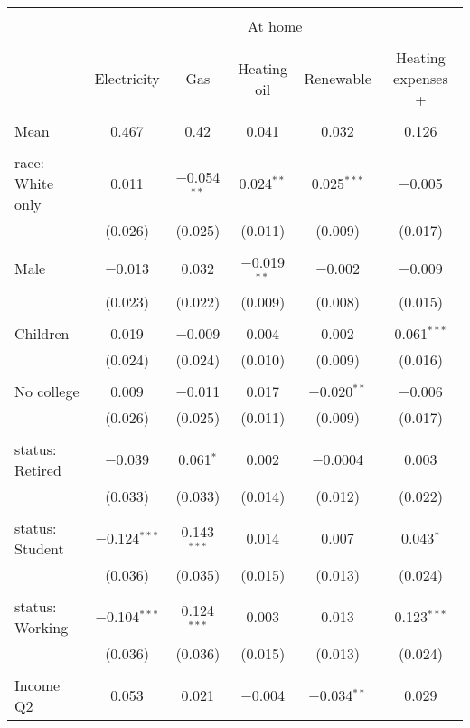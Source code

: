 
\begin{tabular}{@{\extracolsep{5pt}}lccccc} 
\\[-1.8ex]\hline 
\hline \\[-1.8ex] 
 & \multicolumn{5}{c}{At home} \\ 
\cline{2-6} 
\\[-1.8ex] & Electricity & Gas & Heating oil & Renewable & Heating expenses \textdollar 200+ \\ 
\hline \\[-1.8ex] 
 Mean & 0.467 & 0.42 & 0.041 & 0.032 & 0.126  \\ \hline \\[-1.8ex] race: White only & 0.011 & $-$0.054$^{**}$ & 0.024$^{**}$ & 0.025$^{***}$ & $-$0.005 \\ 
  & (0.026) & (0.025) & (0.011) & (0.009) & (0.017) \\ 
  & & & & & \\ 
 Male & $-$0.013 & 0.032 & $-$0.019$^{**}$ & $-$0.002 & $-$0.009 \\ 
  & (0.023) & (0.022) & (0.009) & (0.008) & (0.015) \\ 
  & & & & & \\ 
 Children & 0.019 & $-$0.009 & 0.004 & 0.002 & 0.061$^{***}$ \\ 
  & (0.024) & (0.024) & (0.010) & (0.009) & (0.016) \\ 
  & & & & & \\ 
 No college & 0.009 & $-$0.011 & 0.017 & $-$0.020$^{**}$ & $-$0.006 \\ 
  & (0.026) & (0.025) & (0.011) & (0.009) & (0.017) \\ 
  & & & & & \\ 
 status: Retired & $-$0.039 & 0.061$^{*}$ & 0.002 & $-$0.0004 & 0.003 \\ 
  & (0.033) & (0.033) & (0.014) & (0.012) & (0.022) \\ 
  & & & & & \\ 
 status: Student & $-$0.124$^{***}$ & 0.143$^{***}$ & 0.014 & 0.007 & 0.043$^{*}$ \\ 
  & (0.036) & (0.035) & (0.015) & (0.013) & (0.024) \\ 
  & & & & & \\ 
 status: Working & $-$0.104$^{***}$ & 0.124$^{***}$ & 0.003 & 0.013 & 0.123$^{***}$ \\ 
  & (0.036) & (0.036) & (0.015) & (0.013) & (0.024) \\ 
  & & & & & \\ 
 Income Q2 & 0.053 & 0.021 & $-$0.004 & $-$0.034$^{**}$ & 0.029 \\ 

\end{tabular}
